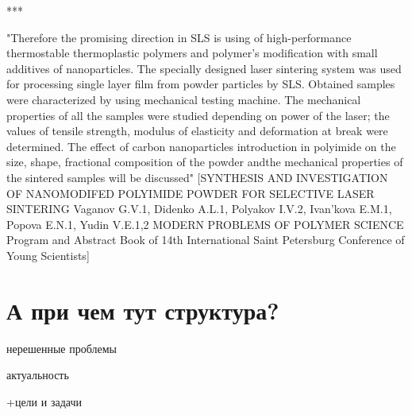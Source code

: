 	
	***
	
	"Therefore the promising direction in SLS is using of high-performance thermostable
thermoplastic polymers and polymer’s modification with small additives of nanoparticles.
The specially designed laser sintering system was used for processing single layer film from powder particles by SLS. Obtained
samples were characterized by using mechanical testing machine.
The mechanical properties of all the samples were studied depending on power of the laser; the values of tensile strength, modulus of
elasticity and deformation at break were determined. The effect of carbon nanoparticles introduction in polyimide on the size, shape,
fractional composition of the powder andthe mechanical properties of the sintered samples will be discussed"
[SYNTHESIS AND INVESTIGATION OF NANOMODIFED POLYIMIDE POWDER FOR
SELECTIVE LASER SINTERING
Vaganov G.V.1, Didenko A.L.1, Polyakov I.V.2, Ivan’kova E.M.1, Popova E.N.1, Yudin V.E.1,2 MODERN PROBLEMS
OF POLYMER SCIENCE
Program and Abstract Book
of 14th International Saint Petersburg Conference
of Young Scientists]	

\section{А при чем тут структура?}
нерешенные проблемы

актуальность

+цели и задачи
